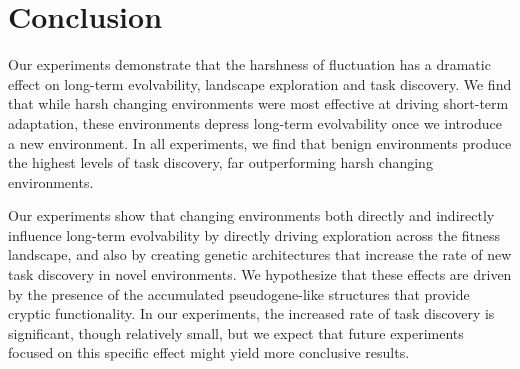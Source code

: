 \documentclass[PhD]{msu-thesis}
\begin{document}
\section{Conclusion}

Our experiments demonstrate that the harshness of fluctuation has a dramatic effect on long-term evolvability, landscape exploration and task discovery. We find that while harsh changing environments were most effective at driving short-term adaptation, these environments depress long-term evolvability once we introduce a new environment. In all experiments, we find that benign environments produce the highest levels of task discovery, far outperforming harsh changing environments.


Our experiments show that changing environments both directly and indirectly influence long-term evolvability by directly driving exploration across the fitness landscape, and also by creating genetic architectures that increase the rate of new task discovery in novel environments. We hypothesize that these effects are driven by the presence of the accumulated pseudogene-like structures that provide cryptic functionality. In our experiments, the increased rate of task discovery is significant, though relatively small, but we expect that future experiments focused on this specific effect might yield more conclusive results. 
\end{document}
